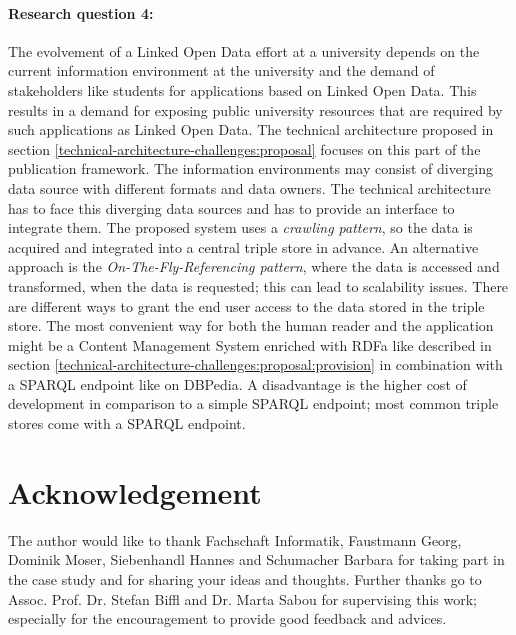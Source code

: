 \documentclass{article}
\begin{document}
\paragraph{Research question 4:} The evolvement of a Linked Open Data effort at a university depends on the current information environment at the university and the demand of stakeholders like students for applications based on Linked Open Data. This results in a demand for exposing public university resources that are required by such applications as Linked Open Data. The technical architecture proposed in section \ref{technical-architecture-challenges:proposal} focuses on this part of the publication framework. The information environments may consist of diverging data source with different formats and data owners. The technical architecture has to face this diverging data sources and has to provide an interface to integrate them. The proposed system uses a \textit{crawling pattern}, so the data is acquired and integrated into a central triple store in advance. An alternative approach is the \textit{On-The-Fly-Referencing pattern}, where the data is accessed and transformed, when the data is requested; this can lead to scalability issues.\cite{heath_linked_2011} There are different ways to grant the end user access to the data stored in the triple store. The most convenient way for both the human reader and the application might be a Content Management System enriched with RDFa like described in section \ref{technical-architecture-challenges:proposal:provision} in combination with a SPARQL endpoint like on DBPedia. A disadvantage is the higher cost of development in comparison to a simple SPARQL endpoint; most common triple stores come with a SPARQL endpoint. 


 
\section{Acknowledgement}
\label{acknowledgement}
The author would like to thank Fachschaft Informatik, Faustmann Georg, Dominik Moser, Siebenhandl Hannes and Schumacher Barbara for taking part in the case study and for sharing your ideas and thoughts. Further thanks go to Assoc. Prof. Dr. Stefan Biffl and Dr. Marta Sabou for supervising this work; especially for the encouragement to provide good feedback and advices.
\end{document}
